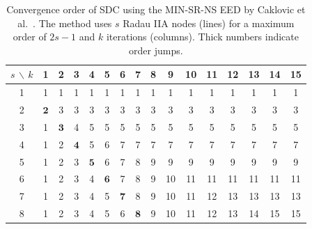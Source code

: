 \documentclass[sn-mathphys-num]{sn-jnl}%
\theoremstyle{thmstyleone}%
\theoremstyle{thmstyletwo}%
\theoremstyle{thmstylethree}%
\begin{document}
\begin{table}[h]
	\bgroup
	\def\arraystretch{1}%
	\begin{tabular}{c||c|c|c|c|c|c|c|c|c|c|c|c|c|c|c|}
		\centering
		 $s$ $\backslash$ $k$ & 1 & 2 & 3 & 4 & 5 & 6 & 7 & 8 & 9 & 10 & 11 & 12 & 13 & 14 & 15 \\
		\hline
		\hline
		1 & 1 & 1 & 1 & 1 & 1 & 1 & 1 & 1 & 1 & 1 & 1 & 1 & 1 & 1 & 1 \\
		\hline
		2 & $\bm{2}$ & 3 & 3 & 3 & 3 & 3 & 3 & 3 & 3 & 3 & 3 & 3 & 3 &3 & 3 \\
		\hline
		3 & 1 & $\bm{3}$ & 4 & 5 & 5 & 5 & 5 & 5 & 5 & 5 & 5 & 5 & 5 & 5 & 5\\
		\hline
		4 & 1 & 2 & $\bm{4}$ & 5 & 6 & 7 & 7 & 7 & 7 & 7 & 7 & 7 & 7 & 7 & 7 \\
		\hline
		5 & 1 & 2 & 3 & $\bm{5}$ & 6 & 7 & 8 & 9 & 9 & 9 & 9 & 9 & 9 & 9 & 9  \\
		\hline
		6 & 1 & 2 & 3 & 4 & $\bm{6}$ & 7 & 8 & 9 &10&11&11&11&11&11&11 \\
		\hline
		7 & 1 & 2 & 3 & 4 & 5 & $\bm{7}$ & 8 & 9 &10&11&12&13&13&13&13 \\
		\hline
		8 & 1 & 2 & 3 & 4 & 5 & 6 & $\bm{8}$ & 9 &10&11&12&13&14&15&15 \\
		\hline
	\end{tabular}
	\egroup
	\caption{Convergence order of SDC using the MIN-SR-NS EED by Caklovic et al.~\cite{CaklovicEtAl2025}. The method uses $s$ Radau IIA nodes (lines) for a maximum order of $2s -1$ and $k$ iterations (columns). Thick numbers indicate order jumps. }
	\label{table:MINRADAU}
\end{table}
\end{document}
